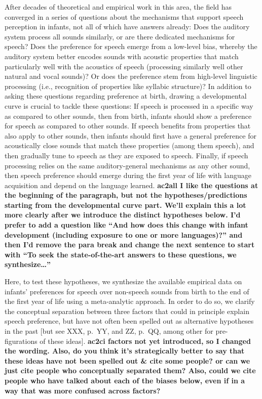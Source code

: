 \documentclass[
  english,
  man]{apa6}
\begin{document}
After decades of theoretical and empirical work in this area, the field has converged in a series of questions about the mechanisms that support speech perception in infants, not all of which have answers already: Does the auditory system process all sounds similarly, or are there dedicated mechanisms for speech? Does the preference for speech emerge from a low-level bias, whereby the auditory system better encodes sounds with acoustic properties that match particularly well with the acoustics of speech (processing similarly well other natural and vocal sounds)? Or does the preference stem from high-level linguistic processing (i.e., recognition of properties like syllabic structure)? In addition to asking these questions regarding preference at birth, drawing a developmental curve is crucial to tackle these questions: If speech is processed in a specific way as compared to other sounds, then from birth, infants should show a preference for speech as compared to other sounds. If speech benefits from properties that also apply to other sounds, then infants should first have a general preference for acoustically close sounds that match these properties (among them speech), and then gradually tune to speech as they are exposed to speech. Finally, if speech processing relies on the same auditory-general mechanisms as any other sound, then speech preference should emerge during the first year of life with language acquisition and depend on the language learned. \textbf{ac2all I like the questions at the beginning of the paragraph, but not the hypotheses/predictions starting from the developmental curve part. We'll explain this a lot more clearly after we introduce the distinct hypotheses below. I'd prefer to add a question like ``And how does this change with infant development (including exposure to one or more languages)?'' and then I'd remove the para break and change the next sentence to start with ``To seek the state-of-the-art answers to these questions, we synthesize\ldots{}''}

Here, to test these hypotheses, we synthesize the available empirical data on infants' preferences for speech over non-speech sounds from birth to the end of the first year of life using a meta-analytic approach. In order to do so, we clarify the conceptual separation between three factors that could in principle explain speech preference, but have not often been spelled out as alternative hypotheses in the past {[}but see XXX, p.~YY, and ZZ, p.~QQ, among other for pre-figurations of these ideas{]}.
\textbf{ac2ci factors not yet introduced, so I changed the wording. Also, do you think it's strategically better to say that these ideas have not been spelled out \& cite some people? or can we just cite people who conceptually separated them? Also, could we cite people who have talked about each of the biases below, even if in a way that was more confused across factors?}
\end{document}

